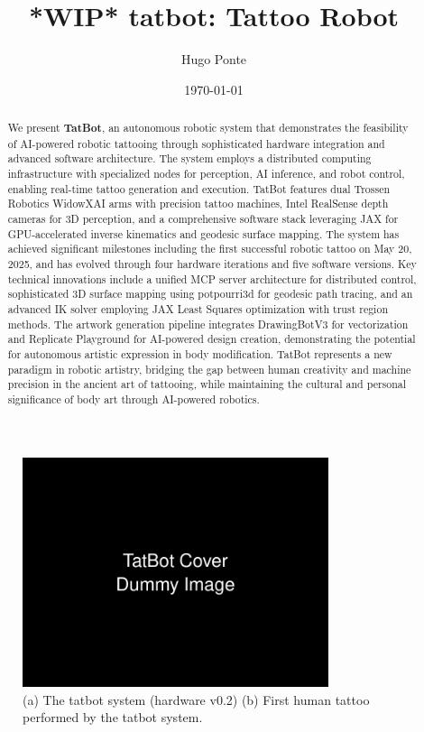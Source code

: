 \documentclass[11pt]{article}
\title{ *WIP* tatbot: Tattoo Robot}
\author{Hugo Ponte}
\date{\today}
\begin{document}
\maketitle

\begin{figure}[h]
    \centering
    \includegraphics[width=0.8\textwidth]{figures/cover.png}
    \caption{(a) The tatbot system (hardware v0.2) (b) First human tattoo performed by the tatbot system. }
    \label{fig:cover}
\end{figure}


\begin{abstract}
We present \textbf{TatBot}, an autonomous robotic system that demonstrates the feasibility of AI-powered robotic tattooing through sophisticated hardware integration and advanced software architecture.
The system employs a distributed computing infrastructure with specialized nodes for perception, AI inference, and robot control, enabling real-time tattoo generation and execution.
TatBot features dual Trossen Robotics WidowXAI arms with precision tattoo machines, Intel RealSense depth cameras for 3D perception, and a comprehensive software stack leveraging JAX for GPU-accelerated inverse kinematics and geodesic surface mapping.
The system has achieved significant milestones including the first successful robotic tattoo on May 20, 2025, and has evolved through four hardware iterations and five software versions.
Key technical innovations include a unified MCP server architecture for distributed control, sophisticated 3D surface mapping using potpourri3d for geodesic path tracing, and an advanced IK solver employing JAX Least Squares optimization with trust region methods.
The artwork generation pipeline integrates DrawingBotV3 for vectorization and Replicate Playground for AI-powered design creation, demonstrating the potential for autonomous artistic expression in body modification.
TatBot represents a new paradigm in robotic artistry, bridging the gap between human creativity and machine precision in the ancient art of tattooing, while maintaining the cultural and personal significance of body art through AI-powered robotics.
\end{abstract}
\end{document}
